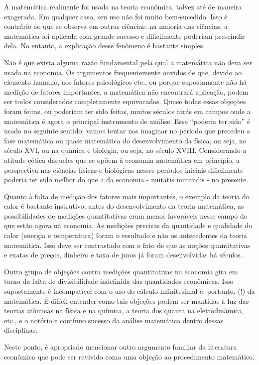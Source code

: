 \documentclass[a4paper,12pt]{article}[abntex2]
\begin{document}
A matemática realmente foi usada na teoria econômica, talvez até de maneira exagerada. Em qualquer caso, seu uso não foi muito bem-sucedido. Isso é contrário ao que se observa em outras ciências: na maioria das ciências, a matemática foi aplicada com grande sucesso e dificilmente poderiam prescindir dela. No entanto, a explicação desse fenômeno é bastante simples.

Não é que exista alguma razão fundamental pela qual a matemática não deva ser usada na economia. Os argumentos frequentemente ouvidos de que, devido ao elemento humano, aos fatores psicológicos etc., ou porque supostamente não há medição de fatores importantes, a matemática não encontrará aplicação, podem ser todos considerados completamente equivocados. Quase todas essas objeções foram feitas, ou poderiam ter sido feitas, muitos séculos atrás em campos onde a matemática é agora o principal instrumento de análise. Esse “poderia ter sido” é usado no seguinte sentido: vamos tentar nos imaginar no período que precedeu a fase matemática ou quase matemática do desenvolvimento da física, ou seja, no século XVI, ou na química e biologia, ou seja, no século XVIII. Considerando a atitude cética daqueles que se opõem à economia matemática em princípio, a perspectiva nas ciências físicas e biológicas nesses períodos iniciais dificilmente poderia ter sido melhor do que a da economia - mutatis mutandis - no presente.

Quanto à falta de medição dos fatores mais importantes, o exemplo da teoria do calor é bastante instrutivo; antes do desenvolvimento da teoria matemática, as possibilidades de medições quantitativas eram menos favoráveis nesse campo do que estão agora na economia. As medições precisas da quantidade e qualidade do calor (energia e temperatura) foram o resultado e não os antecedentes da teoria matemática. Isso deve ser contrastado com o fato de que as noções quantitativas e exatas de preços, dinheiro e taxa de juros já foram desenvolvidas há séculos.

Outro grupo de objeções contra medições quantitativas na economia gira em torno da falta de divisibilidade indefinida das quantidades econômicas. Isso supostamente é incompatível com o uso do cálculo infinitesimal e, portanto, (!) da matemática. É difícil entender como tais objeções podem ser mantidas à luz das teorias atômicas na física e na química, a teoria dos quanta na eletrodinâmica, etc., e o notório e contínuo sucesso da análise matemática dentro dessas disciplinas.

Neste ponto, é apropriado mencionar outro argumento familiar da literatura econômica que pode ser revivido como uma objeção ao procedimento matemático.
\end{document}
